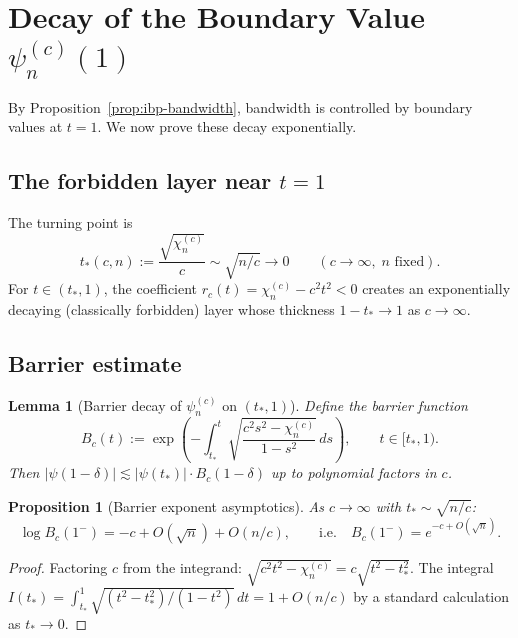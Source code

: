 \documentclass[12pt,a4paper]{amsart}
\newtheorem{lemma}[theorem]{Lemma}
\newtheorem{proposition}[theorem]{Proposition}
\theoremstyle{remark}
\begin{document}
\section{Decay of the Boundary Value $\psi_n^{(c)}(1)$}
\label{sec:boundary-decay}

By Proposition~\ref{prop:ibp-bandwidth}, bandwidth is controlled by
boundary values at $t = 1$. We now prove these decay exponentially.

\subsection{The forbidden layer near $t = 1$}
\label{ssec:barrier}

The turning point is
\begin{equation}
\label{eq:physical-tp}
t_*(c,n) := \frac{\sqrt{\chi_n^{(c)}}}{c} \sim \sqrt{n/c} \to 0
\qquad (c \to \infty,\; n \text{ fixed}).
\end{equation}
For $t \in (t_*, 1)$, the coefficient $r_c(t) = \chi_n^{(c)} - c^2t^2 < 0$
creates an exponentially decaying (classically forbidden) layer
whose thickness $1 - t_* \to 1$ as $c \to \infty$.

\subsection{Barrier estimate}
\label{ssec:SL-barrier}

\begin{lemma}[Barrier decay of $\psi_n^{(c)}$ on $(t_*, 1)$]
\label{lem:barrier-decay}
Define the barrier function
\begin{equation}
\label{eq:barrier-fn}
B_c(t) := \exp\!\left(-\int_{t_*}^{t} \sqrt{\frac{c^2 s^2 - \chi_n^{(c)}}{1-s^2}}\,ds\right),
\qquad t \in [t_*, 1).
\end{equation}
Then $|\psi(1-\delta)| \lesssim |\psi(t_*)|\cdot B_c(1-\delta)$
up to polynomial factors in $c$.
\end{lemma}

\begin{proposition}[Barrier exponent asymptotics]
\label{prop:barrier-asymptotics}
As $c \to \infty$ with $t_* \sim \sqrt{n/c}$:
\begin{equation}
\log B_c(1^-) = -c + O(\sqrt{n}) + O(n/c),
\qquad\text{i.e.}\quad B_c(1^-) = e^{-c + O(\sqrt{n})}.
\end{equation}
\end{proposition}

\begin{proof}
Factoring $c$ from the integrand:
$\sqrt{c^2t^2 - \chi_n^{(c)}} = c\sqrt{t^2 - t_*^2}$.
The integral $I(t_*) = \int_{t_*}^1 \sqrt{(t^2-t_*^2)/(1-t^2)}\,dt = 1 + O(n/c)$
by a standard calculation as $t_* \to 0$.
\end{proof}
\end{document}
